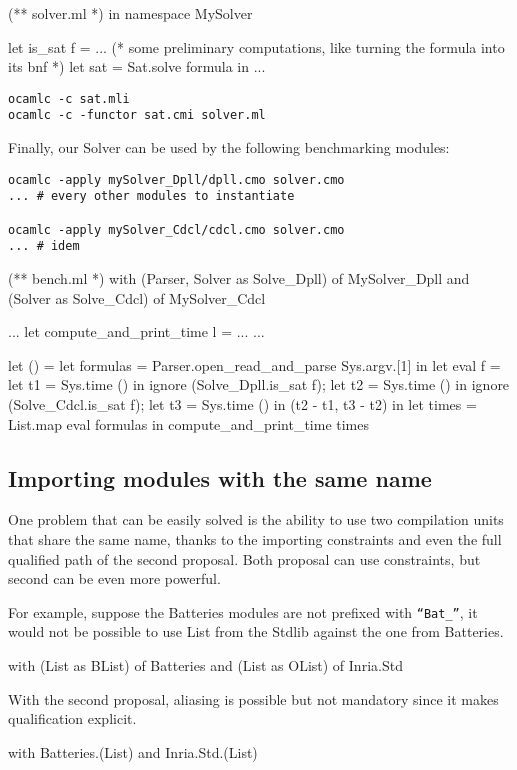 \begin{OCaml}
(** solver.ml *)
in namespace MySolver

let is_sat f =
... 
(* some preliminary computations, like turning the formula into its bnf *)
  let sat = Sat.solve formula in 
...
\end{OCaml}

\begin{verbatim}
ocamlc -c sat.mli
ocamlc -c -functor sat.cmi solver.ml
\end{verbatim}

\medskip

Finally, our Solver can be used by the following benchmarking modules:

\begin{verbatim}
ocamlc -apply mySolver_Dpll/dpll.cmo solver.cmo
... # every other modules to instantiate

ocamlc -apply mySolver_Cdcl/cdcl.cmo solver.cmo
... # idem 
\end{verbatim}

\begin{OCaml}
(** bench.ml *)
with (Parser, Solver as Solve_Dpll) of MySolver_Dpll
and (Solver as Solve_Cdcl) of MySolver_Cdcl

...
let compute_and_print_time l = ...
...

let () =
  let formulas = 
    Parser.open_read_and_parse Sys.argv.[1] in
  let eval f =
    let t1 = Sys.time () in
    ignore (Solve_Dpll.is_sat f);
    let t2 = Sys.time () in
    ignore (Solve_Cdcl.is_sat f);
    let t3 = Sys.time () in
    (t2 - t1, t3 - t2)
  in
  let times = List.map eval formulas in
  compute_and_print_time times
\end{OCaml}

\subsection{Importing modules with the same name}

One problem that can be easily solved is the ability to use two compilation
units that share the same name, thanks to the importing constraints and even the
full qualified path of the second proposal. Both proposal can use constraints,
but second can be even more powerful.

For example, suppose the Batteries modules are not prefixed with
\texttt{``Bat\_''}, it would not be possible to use List from the Stdlib against
the one from Batteries.

\begin{OCaml}
with (List as BList) of Batteries
and (List as OList) of Inria.Std
\end{OCaml}

With the second proposal, aliasing is possible but not mandatory since it makes
qualification explicit.

\begin{OCaml}
with Batteries.(List)
and Inria.Std.(List)
\end{OCaml}

